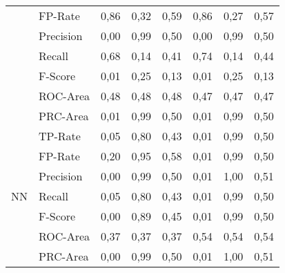 \documentclass[master,twoside,extern,palatino]{rgseThesis}
\begin{document}
\begin{table}[ht]
{\begin{tabular}{|ll|rrr|rrr|}
                     & FP-Rate   & 0,86             & 0,32                 & 0,59                     & 0,86             & 0,27                 & 0,57                      \\
                     & Precision & 0,00             & 0,99                 & 0,50                     & 0,00             & 0,99                 & 0,50                      \\
                     & Recall    & 0,68             & 0,14                 & 0,41                     & 0,74             & 0,14                 & 0,44                      \\
                     & F-Score   & 0,01             & 0,25                 & 0,13                     & 0,01             & 0,25                 & 0,13                      \\
                     & ROC-Area  & 0,48             & 0,48                 & 0,48                     & 0,47             & 0,47                 & 0,47                      \\
                     & PRC-Area  & 0,01             & 0,99                 & 0,50                     & 0,01             & 0,99                 & 0,50                      \\ 
\hline
\multirow{7}{*}{NN}  & TP-Rate   & 0,05             & 0,80                 & 0,43                     & 0,01             & 0,99                 & 0,50                      \\
                     & FP-Rate   & 0,20             & 0,95                 & 0,58                     & 0,01             & 0,99                 & 0,50                      \\
                     & Precision & 0,00             & 0,99                 & 0,50                     & 0,01             & 1,00                 & 0,51                      \\
                     & Recall    & 0,05             & 0,80                 & 0,43                     & 0,01             & 0,99                 & 0,50                      \\
                     & F-Score   & 0,00             & 0,89                 & 0,45                     & 0,01             & 0,99                 & 0,50                      \\
                     & ROC-Area  & 0,37             & 0,37                 & 0,37                     & 0,54             & 0,54                 & 0,54                      \\
                     & PRC-Area  & 0,00             & 0,99                 & 0,50                     & 0,01             & 1,00                 & 0,51                      \\ 

\end{tabular}}
\end{table}
\end{document}
